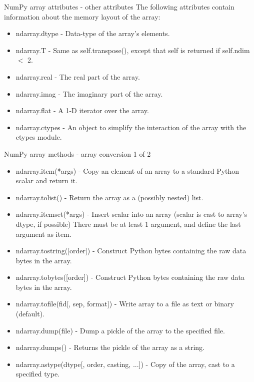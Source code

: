\documentclass[10pt]{beamer}
\begin{document}
\begin{frame}[fragile]{NumPy array attributes - other attributes}
The following attributes contain information about the memory layout of the array:
\begin{itemize}
\item ndarray.dtype -	Data-type of the array’s elements.
\item ndarray.T -	Same as self.transpose(), except that self is returned if self.ndim $<$ 2.
\item ndarray.real - 	The real part of the array.
\item ndarray.imag -	The imaginary part of the array.
\item ndarray.flat -	A 1-D iterator over the array.
\item ndarray.ctypes -	An object to simplify the interaction of the array with the ctypes module.
\end{itemize}
\end{frame}

\begin{frame}{NumPy array methods - array conversion 1 of 2}
\begin{itemize}
\item ndarray.item(*args) - 	Copy an element of an array to a standard Python scalar and return it.
\item ndarray.tolist() -	Return the array as a (possibly nested) list.
\item ndarray.itemset(*args) -	Insert scalar into an array (scalar is cast to array's dtype, if possible) There must be at least 1 argument, and define the last argument as item.
\item ndarray.tostring([order]) -	Construct Python bytes containing the raw data bytes in the array.
\item ndarray.tobytes([order]) - 	Construct Python bytes containing the raw data bytes in the array.
\item ndarray.tofile(fid[, sep, format]) -	Write array to a file as text or binary (default).
\item ndarray.dump(file) -	Dump a pickle of the array to the specified file.
\item ndarray.dumps() -	Returns the pickle of the array as a string.
\item ndarray.astype(dtype[, order, casting, ...]) -	Copy of the array, cast to a specified type.
\end{itemize}
\end{frame}
\end{document}
